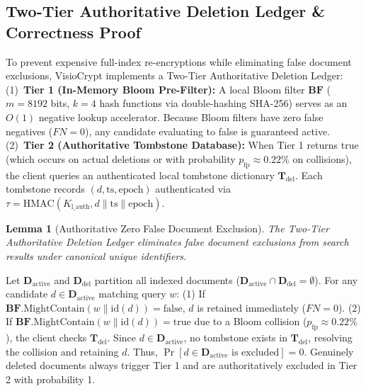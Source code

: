 \documentclass[10pt,conference]{IEEEtran}
\newenvironment{revised}{\color{revcolor}}{}
\newtheorem{lemma}{Lemma}
\newenvironment{revised}{\color{revcolor}}{}
\begin{document}
\begin{revised}
\subsection{Two-Tier Authoritative Deletion Ledger \& Correctness Proof}
To prevent expensive full-index re-encryptions while eliminating false document exclusions, VisioCrypt implements a Two-Tier Authoritative Deletion Ledger:
(1)~\textbf{Tier 1 (In-Memory Bloom Pre-Filter):} A local Bloom filter $\mathbf{BF}$ ($m = 8192$ bits, $k = 4$ hash functions via double-hashing SHA-256) serves as an $O(1)$ negative lookup accelerator. Because Bloom filters have zero false negatives ($FN=0$), any candidate evaluating to false is guaranteed active.
(2)~\textbf{Tier 2 (Authoritative Tombstone Database):} When Tier 1 returns true (which occurs on actual deletions or with probability $p_{\text{fp}} \approx 0.22\%$ on collisions), the client queries an authenticated local tombstone dictionary $\mathbf{T}_{\text{del}}$. Each tombstone records $(d, \text{ts}, \text{epoch})$ authenticated via $\tau = \text{HMAC}(K_{\text{l\_auth}}, d \parallel \text{ts} \parallel \text{epoch})$.

\begin{lemma}[Authoritative Zero False Document Exclusion]
The Two-Tier Authoritative Deletion Ledger eliminates false document exclusions from search results under canonical unique identifiers.
\end{lemma}
\begin{IEEEproof}
Let $\mathbf{D}_{\text{active}}$ and $\mathbf{D}_{\text{del}}$ partition all indexed documents ($\mathbf{D}_{\text{active}} \cap \mathbf{D}_{\text{del}} = \emptyset$). For any candidate $d \in \mathbf{D}_{\text{active}}$ matching query $w$: (1) If $\mathbf{BF}.\text{MightContain}(w \parallel \text{id}(d)) = \text{false}$, $d$ is retained immediately ($FN=0$). (2) If $\mathbf{BF}.\text{MightContain}(w \parallel \text{id}(d)) = \text{true}$ due to a Bloom collision ($p_{\text{fp}} \approx 0.22\%$), the client checks $\mathbf{T}_{\text{del}}$. Since $d \in \mathbf{D}_{\text{active}}$, no tombstone exists in $\mathbf{T}_{\text{del}}$, resolving the collision and retaining $d$. Thus, $\Pr[d \in \mathbf{D}_{\text{active}} \text{ is excluded}] = 0$. Genuinely deleted documents always trigger Tier 1 and are authoritatively excluded in Tier 2 with probability 1.
\end{IEEEproof}


\end{revised}
\end{document}
